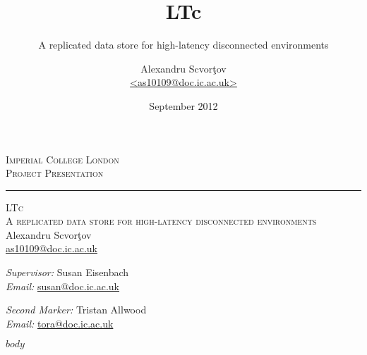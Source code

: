 \documentclass[ignorenonframetext,handout,notes=show]{beamer}
\title{LTc}
\subtitle{A replicated data store for high-latency disconnected environments}
\author{Alexandru Scvor\c tov\\\url{<as10109@doc.ic.ac.uk>}}
\date{September 2012}
\begin{document}
\begin{frame}[plain]

  \begin{center}
    \textsc{Imperial College London}\\
    \textsc{Project Presentation}\\[0.3cm]

    \hrule

    \vspace{0.5cm}

    \textsc{\large LTc}\\
    \textsc{A replicated data store for high-latency disconnected environments}\\[0.5cm]

    Alexandru Scvor\c tov\\
    \url{as10109@doc.ic.ac.uk}
  \end{center}

  \vfill

  \emph{Supervisor:} Susan Eisenbach\\
  \emph{Email:} \url{susan@doc.ic.ac.uk}

  \vspace{0.2cm}

  \emph{Second Marker:} Tristan Allwood\\
  \emph{Email:} \url{tora@doc.ic.ac.uk}

\end{frame}

$body$
\end{document}
